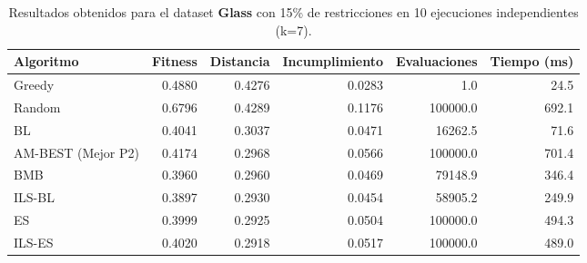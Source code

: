 \begin{table}[H]
    \centering
    \begin{tabular}{lrrrrr}
        \hline
        Algoritmo & Fitness & Distancia & Incumplimiento & Evaluaciones & Tiempo (ms)\\
        \hline
        Greedy & 0.4880 & 0.4276 & 0.0283 & 1.0 & 24.5 \\
        Random & 0.6796 & 0.4289 & 0.1176 & 100000.0 & 692.1 \\
        BL & 0.4041 & 0.3037 & 0.0471 & 16262.5 & 71.6 \\
        AM-BEST (Mejor P2) & 0.4174 & 0.2968 & 0.0566 & 100000.0 & 701.4 \\
        BMB & 0.3960 & 0.2960 & 0.0469 & 79148.9 & 346.4 \\
        ILS-BL & 0.3897 & 0.2930 & 0.0454 & 58905.2 & 249.9 \\
        ES & 0.3999 & 0.2925 & 0.0504 & 100000.0 & 494.3 \\
        ILS-ES & 0.4020 & 0.2918 & 0.0517 & 100000.0 & 489.0 \\
        \hline
    \end{tabular}
    \caption{Resultados obtenidos para el dataset \textbf{Glass} con 15\% de restricciones en  10 ejecuciones independientes (k=7).}
    \label{tab:res_glass_15}
\end{table}